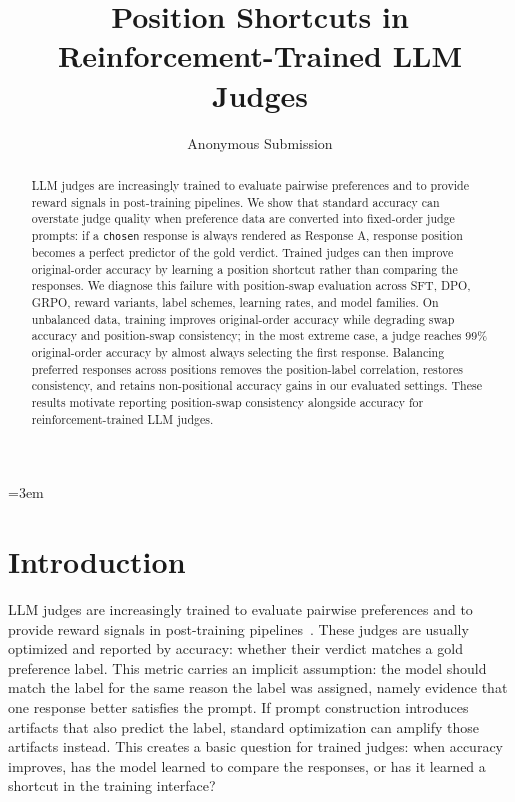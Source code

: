 \documentclass[letterpaper]{article}
\title{Position Shortcuts in Reinforcement-Trained LLM Judges}
\author{Anonymous Submission}
\begin{document}
\emergencystretch=3em
\maketitle

\begin{abstract}
LLM judges are increasingly trained to evaluate pairwise preferences and to provide reward signals in post-training pipelines. We show that standard accuracy can overstate judge quality when preference data are converted into fixed-order judge prompts: if a \texttt{chosen} response is always rendered as Response A, response position becomes a perfect predictor of the gold verdict. Trained judges can then improve original-order accuracy by learning a position shortcut rather than comparing the responses. We diagnose this failure with position-swap evaluation across SFT, DPO, GRPO, reward variants, label schemes, learning rates, and model families. On unbalanced data, training improves original-order accuracy while degrading swap accuracy and position-swap consistency; in the most extreme case, a judge reaches 99\% original-order accuracy by almost always selecting the first response. Balancing preferred responses across positions removes the position-label correlation, restores consistency, and retains non-positional accuracy gains in our evaluated settings. These results motivate reporting position-swap consistency alongside accuracy for reinforcement-trained LLM judges.
\end{abstract}

\section{Introduction}

LLM judges are increasingly trained to evaluate pairwise preferences and to provide reward signals in post-training pipelines~\citep{zheng2023judging,zheng2024arena}. These judges are usually optimized and reported by accuracy: whether their verdict matches a gold preference label. This metric carries an implicit assumption: the model should match the label for the same reason the label was assigned, namely evidence that one response better satisfies the prompt. If prompt construction introduces artifacts that also predict the label, standard optimization can amplify those artifacts instead. This creates a basic question for trained judges: when accuracy improves, has the model learned to compare the responses, or has it learned a shortcut in the training interface?
\end{document}
